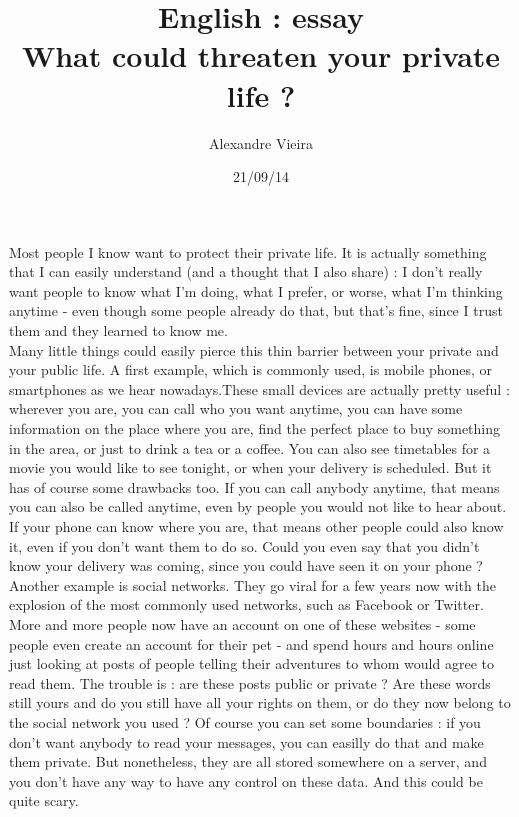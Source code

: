 \documentclass{article}
\title{English : essay\\What could threaten your private life ?}
\author{Alexandre Vieira}
\date{21/09/14}
\begin{document}
\maketitle

Most people I know want to protect their private life. It is actually something that I can easily understand (and a thought that I also share) : I don't really want people to know what I'm doing, what I prefer, or worse, what I'm thinking anytime - even though some people already do that, but that's fine, since I trust them and they learned to know me.\\
Many little things could easily pierce this thin barrier between your private and your public life. A first example, which is commonly used, is mobile phones, or smartphones as we hear nowadays.These small devices are actually pretty useful : wherever you are, you can call who you want anytime, you can have some information on the place where you are, find the perfect place to buy something in the area, or just to drink a tea or a coffee. You can also see timetables for a movie you would like to see tonight, or when your delivery is scheduled.
But it has of course some drawbacks too. If you can call anybody anytime, that means you can also be called anytime, even by people you would not like to hear about. If your phone can know where you are, that means other people could also know it, even if you don't want them to do so. Could you even say that you didn't know your delivery was coming, since you could have seen it on your phone ? \\
Another example is social networks. They go viral for a few years now with the explosion of the most commonly used networks, such as Facebook or Twitter. More and more people now have an account on one of these websites - some people even create an account for their pet - and spend hours and hours online just looking at posts of people telling their adventures to whom would agree to read them. The trouble is : are these posts public or private ? Are these words still yours and do you still have all your rights on them, or do they now belong to the social network you used ? Of course you can set some boundaries : if you don't want anybody to read your messages, you can easilly do that and make them private. But nonetheless, they are all stored somewhere on a server, and you don't have any way to have any control on these data. And this could be quite scary.
\end{document}
